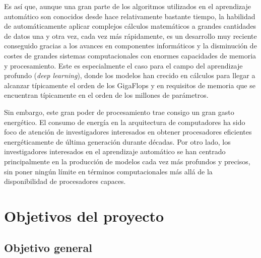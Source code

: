 Es así que, aunque una gran parte de los algoritmos utilizados en el aprendizaje automático son conocidos desde hace relativamente bastante tiempo, la habilidad de automáticamente aplicar complejos cálculos matemáticos a grandes cantidades de datos una y otra vez, cada vez más rápidamente, es un desarrollo muy reciente conseguido gracias a los avances en componentes informáticos y la disminución de costes de grandes sistemas computacionales con enormes capacidades de memoria y procesamiento.
Este es especialmente el caso para el campo del aprendizaje profundo (\emph{deep learning}), donde los modelos han crecido en cálculos para llegar a alcanzar típicamente el orden de los GigaFlops y en requisitos de memoria que se encuentran típicamente en el orden de los millones de parámetros.

Sin embargo, este gran poder de procesamiento trae consigo un gran gasto energético.
El consumo de energía en la arquitectura de computadores ha sido foco de atención de investigadores interesados en obtener procesadores eficientes energéticamente de última generación durante décadas. 
Por otro lado, los investigadores interesados en el aprendizaje automático se han centrado principalmente en la producción de modelos cada vez más profundos y precisos, sin poner ningún límite en términos computacionales más allá de la disponibilidad de procesadores capaces.




\section{Objetivos del proyecto}
\label{sec:objetivos}

\subsection{Objetivo general} %
\label{sec:objetivo-general} %


